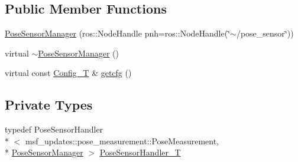 \subsection*{Public Member Functions}
\begin{DoxyCompactItemize}
\item 
\hyperlink{classmsf__pose__sensor_1_1PoseSensorManager_a446899edc7caa365192f14bcbe5889c3}{Pose\-Sensor\-Manager} (ros\-::\-Node\-Handle pnh=ros\-::\-Node\-Handle(\char`\"{}$\sim$/pose\-\_\-sensor\char`\"{}))
\item 
virtual \hyperlink{classmsf__pose__sensor_1_1PoseSensorManager_aa0df861639f3254f9f791e8088ebdfa8}{$\sim$\-Pose\-Sensor\-Manager} ()
\item 
virtual const \hyperlink{namespacemsf__pose__sensor_a1d993c8c6010718666c4e9dc159bd3dd}{Config\-\_\-\-T} \& \hyperlink{classmsf__pose__sensor_1_1PoseSensorManager_a2850611a6b92362c4547750855185516}{getcfg} ()
\end{DoxyCompactItemize}
\subsection*{Private Types}
\begin{DoxyCompactItemize}
\item 
typedef Pose\-Sensor\-Handler\\*
$<$ msf\-\_\-updates\-::pose\-\_\-measurement\-::\-Pose\-Measurement, \\*
\hyperlink{classmsf__pose__sensor_1_1PoseSensorManager}{Pose\-Sensor\-Manager} $>$ \hyperlink{classmsf__pose__sensor_1_1PoseSensorManager_a424c57464ea7530998340db1e820688a}{Pose\-Sensor\-Handler\-\_\-\-T}
\end{DoxyCompactItemize}
